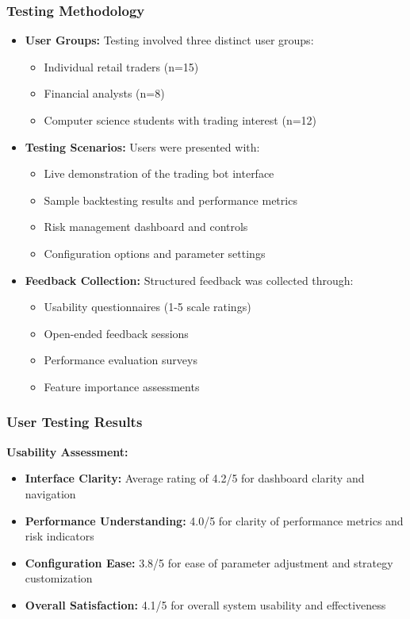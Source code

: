 \documentclass[conference]{IEEEtran}
\begin{document}
\subsubsection{Testing Methodology}
\begin{itemize}
    \item \textbf{User Groups:} Testing involved three distinct user groups:
    \begin{itemize}
        \item Individual retail traders (n=15)
        \item Financial analysts (n=8)
        \item Computer science students with trading interest (n=12)
    \end{itemize}
    \item \textbf{Testing Scenarios:} Users were presented with:
    \begin{itemize}
        \item Live demonstration of the trading bot interface
        \item Sample backtesting results and performance metrics
        \item Risk management dashboard and controls
        \item Configuration options and parameter settings
    \end{itemize}
    \item \textbf{Feedback Collection:} Structured feedback was collected through:
    \begin{itemize}
        \item Usability questionnaires (1-5 scale ratings)
        \item Open-ended feedback sessions
        \item Performance evaluation surveys
        \item Feature importance assessments
    \end{itemize}
\end{itemize}

\subsubsection{User Testing Results}
\textbf{Usability Assessment:}
\begin{itemize}
    \item \textbf{Interface Clarity:} Average rating of 4.2/5 for dashboard clarity and navigation
    \item \textbf{Performance Understanding:} 4.0/5 for clarity of performance metrics and risk indicators
    \item \textbf{Configuration Ease:} 3.8/5 for ease of parameter adjustment and strategy customization
    \item \textbf{Overall Satisfaction:} 4.1/5 for overall system usability and effectiveness
\end{itemize}
\end{document}
